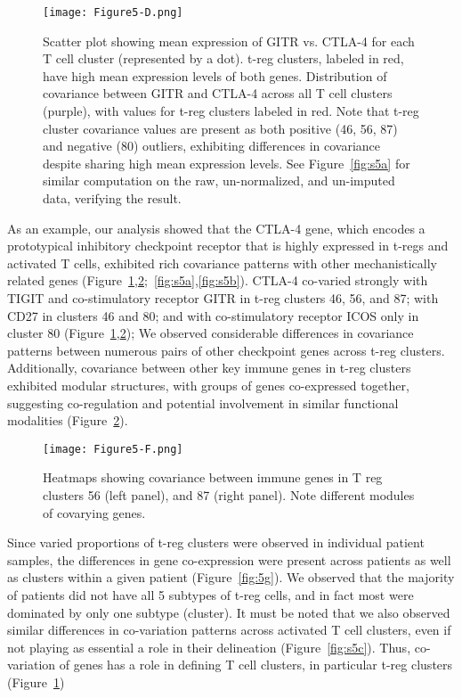 \begin{figure}
\centering
\texttt{[image: Figure5-D.png]}
\caption{Scatter plot showing mean expression of GITR vs. CTLA-4 for each T cell cluster (represented by a dot).
  t-reg clusters, labeled in red, have high mean expression levels of both genes.
Distribution of covariance between GITR and CTLA-4 across all T cell clusters (purple), with values for t-reg clusters labeled in red.
Note that t-reg cluster covariance values are present as both positive (46, 56, 87) and negative (80) outliers, exhibiting differences in covariance despite sharing high mean expression levels.
See Figure~\ref{fig:s5a} for similar computation on the raw, un-normalized, and un-imputed data, verifying the result.
}
\label{fig:5d}
\end{figure}

As an example, our analysis showed that the CTLA-4 gene, which encodes a prototypical inhibitory checkpoint receptor that is highly expressed in t-regs and activated T cells, exhibited rich covariance patterns with other mechanistically related genes (Figure~\ref{fig:5d},\ref{fig:5f};~\ref{fig:s5a},\ref{fig:s5b}).
CTLA-4 co-varied strongly with TIGIT and co-stimulatory receptor GITR in t-reg clusters 46, 56, and 87; with CD27 in clusters 46 and 80; and with co-stimulatory receptor ICOS only in cluster 80 (Figure~\ref{fig:5d},\ref{fig:5f}); We observed considerable differences in covariance patterns between numerous pairs of other checkpoint genes across t-reg clusters.
Additionally, covariance between other key immune genes in t-reg clusters exhibited modular structures, with groups of genes co-expressed together, suggesting co-regulation and potential involvement in similar functional modalities (Figure~\ref{fig:5f}).

\begin{figure}
\centering
\texttt{[image: Figure5-F.png]}
\caption{Heatmaps showing covariance between immune genes in T reg clusters 56 (left panel), and 87 (right panel). Note different modules of covarying genes.
}
\label{fig:5f}
\end{figure}

Since varied proportions of t-reg clusters were observed in individual patient samples, the differences in gene co-expression were present across patients as well as clusters within a given patient (Figure~\ref{fig:5g}).
We observed that the majority of patients did not have all 5 subtypes of t-reg cells, and in fact most were dominated by only one subtype (cluster).
It must be noted that we also observed similar differences in co-variation patterns across activated T cell clusters, even if not playing as essential a role in their delineation (Figure~\ref{fig:s5c}).
Thus, co-variation of genes has a role in defining T cell clusters, in particular t-reg clusters (Figure~\ref{fig:5d})

